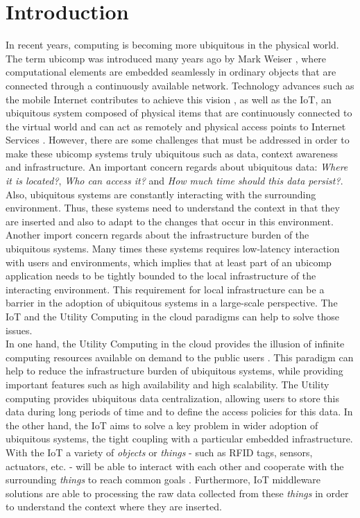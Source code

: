 
\chapter{Introduction}
\label{chapter:introduction}
In recent years, computing is becoming more ubiquitous in the physical world. The term \gls{ubicomp}
was introduced many years ago by Mark Weiser \cite{weiser1991computer}, where computational elements
are embedded seamlessly in ordinary objects that are connected through a continuously available network.
Technology advances such as the mobile Internet contributes to achieve this vision \cite{gubbi2013internet},
as well as the \gls{IoT}, an ubiquitous system composed of physical items that are continuously connected
to the virtual world and can act as remotely and physical access points to Internet Services \cite{mattern2010internet}.
However, there are some challenges that must be addressed in order to make these \gls{ubicomp} systems truly
ubiquitous \cite{caceres2012ubicomp} such as data, context awareness and infrastructure. An important
concern regards about ubiquitous data: \textit{Where it is located?}, \textit{Who can access it?} and
\textit{How much time should this data persist?}. Also, ubiquitous systems are constantly interacting
with the surrounding environment. Thus, these systems need to understand the context in that they are
inserted and also to adapt to the changes that occur in this environment. Another import concern regards
about the infrastructure burden of the ubiquitous systems. Many times these systems requires low-latency
interaction with users and environments, which implies that at least part of an \gls{ubicomp} application
needs to be tightly bounded to the local infrastructure of the interacting environment. This requirement
for local infrastructure can be a barrier in the adoption of ubiquitous systems in a large-scale
perspective. The \gls{IoT} and the Utility Computing in the cloud paradigms can help to solve those
issues.\\

In one hand, the Utility Computing in the cloud provides the illusion of infinite computing resources
available on demand to the public users \cite{armbrust2010view}. This paradigm can help to reduce the
infrastructure burden of ubiquitous systems, while providing important features such as high availability
and high scalability. The Utility computing provides ubiquitous data centralization, allowing users
to store this data during long periods of time and to define the access policies for this data.
%
In the other hand, the \gls{IoT} aims to solve a key problem in wider adoption of ubiquitous systems,
the tight coupling with a particular embedded infrastructure. With the \gls{IoT} a variety of
\textit{objects} or \textit{things} - such as \gls{RFID} tags, sensors, actuators, etc. - will be
able to interact with each other and cooperate with the surrounding \textit{things} to reach common
goals \cite{atzori2010internet}. Furthermore, \gls{IoT} middleware solutions are able to processing
the raw data collected from these \textit{things} in order to understand the context where they
are inserted.\\

